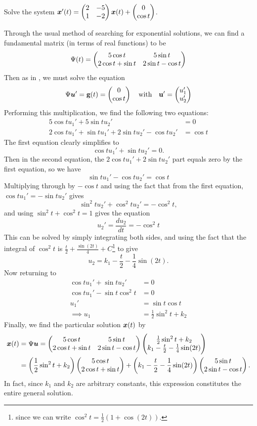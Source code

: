 \begin{eg}\label{eg:varparamsolve}
	Solve the system $\bm{x}'(t) = \begin{pmatrix}2 & -5 \\ 1 & -2\end{pmatrix}\bm{x}(t) + \begin{pmatrix}0\\\cos t\end{pmatrix}$.
	
	Through the usual method of searching for exponential solutions, we can find a fundamental matrix (in terms of real functions) to be
	\[
	\Psi(t) = \begin{pmatrix}5\cos t & 5\sin t \\ 2\cos t + \sin t & 2\sin t - \cos t\end{pmatrix}
	\]
	Then as in , we must solve the equation 
	\[
	\Psi \bm{u}' = \textbf{g}(t) = \begin{pmatrix}0 \\ \cos t\end{pmatrix} \quad \text{with} \quad \textbf{u}' = \begin{pmatrix}u_1' \\ u_2'\end{pmatrix}
	\]
	Performing this multiplication, we find the following two equations:
	\begin{align*}
		5\cos t u_1' + 5\sin t u_2' &= 0 \\ 
		2\cos t u_1' + \sin t u_1' + 2\sin t u_2' - \cos t u_2' &= \cos t
	\end{align*}
	The first equation clearly simplifies to 
	\begin{equation}\label{eq:varparameg2}
		\cos t u_1' + \sin t u_2' = 0.
	\end{equation}
	Then in the second equation, the $2\cos t u_1' + 2\sin t u_2'$ part equals zero by the first equation, so we have
	\[
	\sin t u_1' - \cos t u_2' = \cos t
	\]
	Multiplying through by $-\cos t$ and using the fact that from the first equation, $\cos t u_1' = -\sin t u_2'$ gives
	\[
	\sin^2t u_2' + \cos^2t u_2' = -\cos^2t,
	\]
	and using $\sin^2t + \cos^2t = 1$ gives the equation 
	\[
	u_2' = \frac{du_2}{dt} = -\cos^2t
	\] 
	This can be solved by simply integrating both sides, and using the fact that the integral of $\cos^2t$ is $\frac{t}{2} + \frac{\sin(2t)}{4} + C$\footnote{since we can write $\cos^2t = \frac12(1 + \cos(2t))$.} to give
	\[
	u_2 = k_1 - \frac{t}{2} - \frac14\sin(2t).
	\]
	Now returning to 
	\begin{align*}
		\cos t u_1' + \sin t u_2' &= 0 \\
		\cos t u_1' - \sin t \cos^2t &= 0 \\
		u_1' &= \sin t \cos t \\
		\implies u_1 &= \frac12 \sin^2 t + k_2
	\end{align*}
	Finally, we find the particular solution $\bm{x}(t)$ by
	\begin{align*}
		\bm{x}(t) &= \Psi \bm{u} = \begin{pmatrix}5\cos t & 5\sin t \\ 2\cos t + \sin t & 2\sin t - \cos t\end{pmatrix} \begin{pmatrix}\frac12 \sin^2 t + k_2 \\ k_1 - \frac{t}{2} - \frac14\sin(2t)\end{pmatrix} \\
		&= \left(\frac12 \sin^2t + k_2\right)\begin{pmatrix}5\cos t \\ 2\cos t + \sin t\end{pmatrix} + \left(k_1 - \frac{t}{2} - \frac14\sin(2t)\right)\begin{pmatrix}5\sin t \\ 2\sin t - \cos t\end{pmatrix}.
	\end{align*}
	In fact, since $k_1$ and $k_2$ are arbitrary constants, this expression constitutes the entire general solution.
\end{eg}

